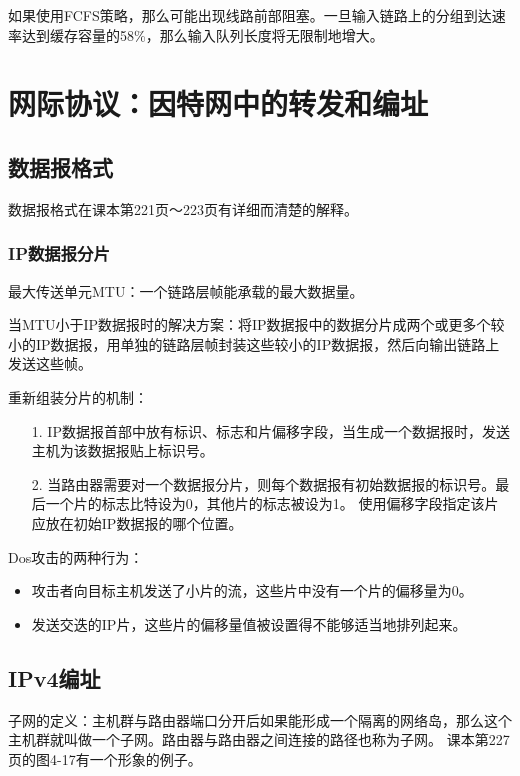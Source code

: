 \documentclass[a4paper,left=2.5cm,right=2.5cm,11pt]{article}
\begin{document}
	如果使用FCFS策略，那么可能出现线路前部阻塞。一旦输入链路上的分组到达速率达到缓存容量的58\%，那么输入队列长度将无限制地增大。

\section{网际协议：因特网中的转发和编址}
\subsection{数据报格式}
	数据报格式在课本第221页～223页有详细而清楚的解释。\par

\subsubsection{IP数据报分片}
	最大传送单元MTU：一个链路层帧能承载的最大数据量。\par

	当MTU小于IP数据报时的解决方案：将IP数据报中的数据分片成两个或更多个较小的IP数据报，用单独的链路层帧封装这些较小的IP数据报，然后向输出链路上发送这些帧。\par

	重新组装分片的机制：
	\begin{itemize}
		\item[1.] IP数据报首部中放有标识、标志和片偏移字段，当生成一个数据报时，发送主机为该数据报贴上标识号。
		\item[2.] 当路由器需要对一个数据报分片，则每个数据报有初始数据报的标识号。最后一个片的标志比特设为0，其他片的标志被设为1。
				  使用偏移字段指定该片应放在初始IP数据报的哪个位置。
	\end{itemize}

	Dos攻击的两种行为：
	\begin{itemize}
		\item 攻击者向目标主机发送了小片的流，这些片中没有一个片的偏移量为0。
		\item 发送交迭的IP片，这些片的偏移量值被设置得不能够适当地排列起来。
	\end{itemize}

\subsection{IPv4编址}
	子网的定义：主机群与路由器端口分开后如果能形成一个隔离的网络岛，那么这个主机群就叫做一个子网。路由器与路由器之间连接的路径也称为子网。
	课本第227页的图4-17有一个形象的例子。\par
\end{document}
